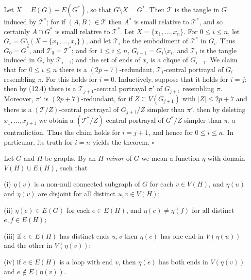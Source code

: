 Let $X = E(G) - E(G^*)$, so that $G \setminus X = G^*$. Then $\mathscr{T}$ is the tangle in $G$ induced by $\mathscr{T}^*$; for if $(A, B) \in \mathscr{T}$ then $A^*$ is small relative to $\mathscr{T}^*$, and so certainly $A \cap G^*$ is small relative to $\mathscr{T}^*$. Let $X = \{x_1, \dots, x_n\}$. For $0 \le i \le n$, let $G_i = G \setminus (X - \{x_1, \dots, x_i\})$, and let $\mathscr{T}_i$ be the embodiment of $\mathscr{T}^*$ in $G_i$. Thus $G_0 = G^*$, and $\mathscr{T}_0 = \mathscr{T}^*$; and for $1 \le i \le n$, $G_{i-1} = G_i \setminus x_i$, and $\mathscr{T}_i$ is the tangle induced in $G_i$ by $\mathscr{T}_{i-1}$; and the set of ends of $x_i$ is a clique of $G_{i-1}$. We claim that for $0 \le i \le n$ there is a $(2p+7)$-redundant, $\mathscr{T}_i$-central portrayal of $G_i$ resembling $\pi$. For this holds for $i = 0$. Inductively, suppose that it holds for $i = j$; then by (12.4) there is a $\mathscr{T}_{j+1}$-central portrayal $\pi'$ of $G_{j+1}$ resembling $\pi$. Moreover, $\pi'$ is $(2p+7)$-redundant, for if $Z \subseteq V(G_{j+1})$ with $|Z| \le 2p+7$ and there is a $(\mathscr{T}/Z)$-central portrayal of $G_{j+1}/Z$ simpler than $\pi'$, then by deleting $x_1, \dots, x_{j+1}$ we obtain a $(\mathscr{T}^*/Z)$-central portrayal of $G^*/Z$ simpler than $\pi$, a contradiction. Thus the claim holds for $i = j+1$, and hence for $0 \le i \le n$. In particular, its truth for $i = n$ yields the theorem. $\square$


Let $G$ and $H$ be graphs. By an \textit{$H$-minor} of $G$ we mean a function $\eta$ with domain $V(H) \cup E(H)$, such that

\hspace*{12pt}(i) $\eta(v)$ is a non-null connected subgraph of $G$ for each $v \in V(H)$, and $\eta(u)$ and $\eta(v)$ are disjoint for all distinct $u, v \in V(H)$;

\hspace*{12pt}(ii) $\eta(e) \in E(G)$ for each $e \in E(H)$, and $\eta(e) \ne \eta(f)$ for all distinct $e, f \in E(H)$;

\hspace*{12pt}(iii) if $e \in E(H)$ has distinct ends $u, v$ then $\eta(e)$ has one end in $V(\eta(u))$ and the other in $V(\eta(v))$;

\hspace*{12pt}(iv) if $e \in E(H)$ is a loop with end $v$, then $\eta(e)$ has both ends in $V(\eta(v))$ and $e \notin E(\eta(v))$.

